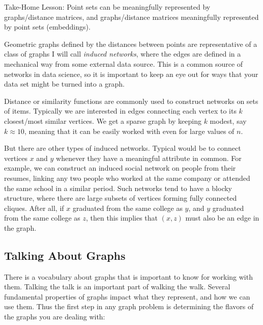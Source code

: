 \documentclass[10pt]{article}
\begin{document}
Take-Home Lesson: Point sets can be meaningfully represented by graphs/distance matrices, and graphs/distance matrices meaningfully represented by point sets (embeddings).

Geometric graphs defined by the distances between points are representative of a class of graphs I will call \textit{induced networks}, where the edges are defined in a mechanical way from some external data source. This is a common source of networks in data science, so it is important to keep an eye out for ways that your data set might be turned into a graph.

Distance or similarity functions are commonly used to construct networks on sets of items. Typically we are interested in edges connecting each vertex to its $k$ closest/most similar vertices. We get a sparse graph by keeping $k$ modest, say $k \approx 10$, meaning that it can be easily worked with even for large values of $n$.

But there are other types of induced networks. Typical would be to connect vertices $x$ and $y$ whenever they have a meaningful attribute in common. For example, we can construct an induced social network on people from their resumes, linking any two people who worked at the same company or attended the same school in a similar period. Such networks tend to have a blocky structure, where there are large subsets of vertices forming fully connected cliques. After all, if $x$ graduated from the same college as $y$, and $y$ graduated from the same college as $z$, then this implies that $(x, z)$ must also be an edge in the graph.

\subsection{Talking About Graphs}
There is a vocabulary about graphs that is important to know for working with them. Talking the talk is an important part of walking the walk. Several fundamental properties of graphs impact what they represent, and how we can use them. Thus the first step in any graph problem is determining the flavors of the graphs you are dealing with:
\end{document}
